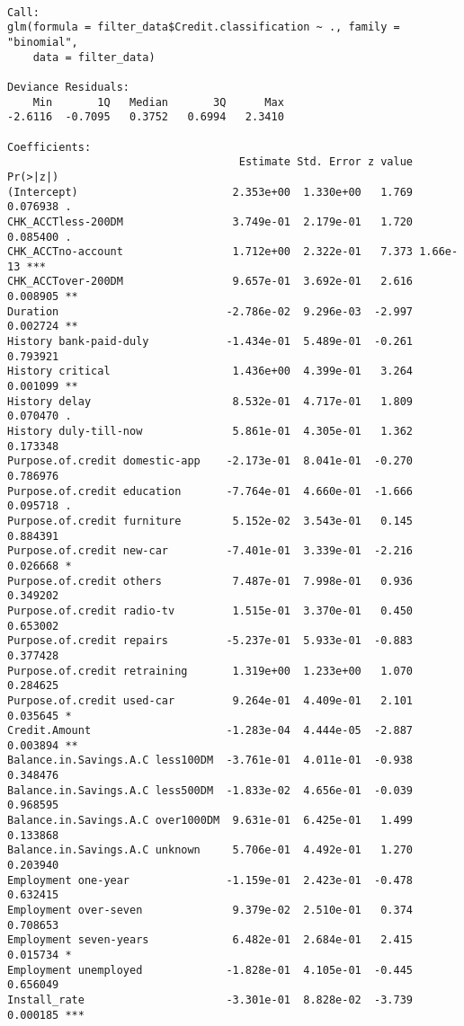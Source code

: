 \documentclass[11pt]{article}
\begin{document}
    
    \begin{verbatim}

Call:
glm(formula = filter_data$Credit.classification ~ ., family = "binomial", 
    data = filter_data)

Deviance Residuals: 
    Min       1Q   Median       3Q      Max  
-2.6116  -0.7095   0.3752   0.6994   2.3410  

Coefficients:
                                    Estimate Std. Error z value Pr(>|z|)    
(Intercept)                        2.353e+00  1.330e+00   1.769 0.076938 .  
CHK_ACCTless-200DM                 3.749e-01  2.179e-01   1.720 0.085400 .  
CHK_ACCTno-account                 1.712e+00  2.322e-01   7.373 1.66e-13 ***
CHK_ACCTover-200DM                 9.657e-01  3.692e-01   2.616 0.008905 ** 
Duration                          -2.786e-02  9.296e-03  -2.997 0.002724 ** 
History bank-paid-duly            -1.434e-01  5.489e-01  -0.261 0.793921    
History critical                   1.436e+00  4.399e-01   3.264 0.001099 ** 
History delay                      8.532e-01  4.717e-01   1.809 0.070470 .  
History duly-till-now              5.861e-01  4.305e-01   1.362 0.173348    
Purpose.of.credit domestic-app    -2.173e-01  8.041e-01  -0.270 0.786976    
Purpose.of.credit education       -7.764e-01  4.660e-01  -1.666 0.095718 .  
Purpose.of.credit furniture        5.152e-02  3.543e-01   0.145 0.884391    
Purpose.of.credit new-car         -7.401e-01  3.339e-01  -2.216 0.026668 *  
Purpose.of.credit others           7.487e-01  7.998e-01   0.936 0.349202    
Purpose.of.credit radio-tv         1.515e-01  3.370e-01   0.450 0.653002    
Purpose.of.credit repairs         -5.237e-01  5.933e-01  -0.883 0.377428    
Purpose.of.credit retraining       1.319e+00  1.233e+00   1.070 0.284625    
Purpose.of.credit used-car         9.264e-01  4.409e-01   2.101 0.035645 *  
Credit.Amount                     -1.283e-04  4.444e-05  -2.887 0.003894 ** 
Balance.in.Savings.A.C less100DM  -3.761e-01  4.011e-01  -0.938 0.348476    
Balance.in.Savings.A.C less500DM  -1.833e-02  4.656e-01  -0.039 0.968595    
Balance.in.Savings.A.C over1000DM  9.631e-01  6.425e-01   1.499 0.133868    
Balance.in.Savings.A.C unknown     5.706e-01  4.492e-01   1.270 0.203940    
Employment one-year               -1.159e-01  2.423e-01  -0.478 0.632415    
Employment over-seven              9.379e-02  2.510e-01   0.374 0.708653    
Employment seven-years             6.482e-01  2.684e-01   2.415 0.015734 *  
Employment unemployed             -1.828e-01  4.105e-01  -0.445 0.656049    
Install_rate                      -3.301e-01  8.828e-02  -3.739 0.000185 ***

\end{verbatim}
\end{document}
